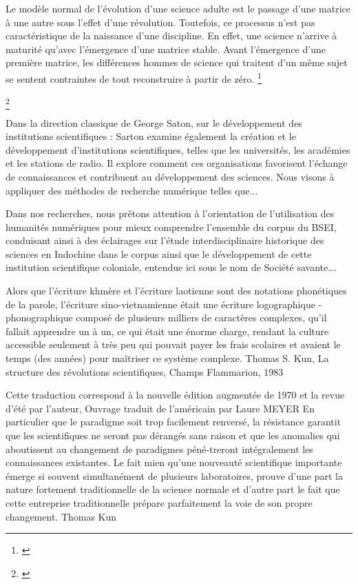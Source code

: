 Le modèle normal de l’évolution d’une science adulte est le passage d’une matrice à une autre sous l’effet d’une révolution. Toutefois, ce processus n’est pas caractéristique de la naissance d’une discipline. En effet, une science n'arrive à maturité qu'avec l'émergence d'une matrice stable. Avant l'émergence d'une première matrice, les différences hommes de science qui traitent d'un même sujet se sentent contraintes de tout reconstruire à partir de zéro. 
\footnote{\cite{malherbe1}}

\footnote{\cite{vinhky}}

Dans la direction classique de George Saton, sur le développement des institutions scientifiques : Sarton examine également la création et le développement d'institutions scientifiques, telles que les universités, les académies et les stations de radio. Il explore comment ces organisations favorisent l'échange de connaissances et contribuent au développement des sciences. Nous visons à appliquer des méthodes de recherche numérique telles que... 

Dans nos recherches, nous prêtons attention à l'orientation de l'utilisation des humanités numériques pour mieux comprendre l'ensemble du corpus du BSEI, conduisant ainsi à des éclairages sur l'étude interdisciplinaire historique des sciences en Indochine dans le corpus ainsi que le développement de cette institution scientifique coloniale, entendue ici sous le nom de Société savante….

Alors que l'écriture khmère et l'écriture laotienne sont des notations phonétiques de la parole, l'écriture sino-vietnamienne était une écriture logographique -phonographique composé de plusieurs milliers de caractères complexes, qu'il fallait apprendre un à un, ce qui était une énorme charge, rendant la culture accessible seulement à très peu qui pouvait payer les frais scolaires et avaient le temps (des années) pour maîtriser ce système complexe.
Thomas S. Kun, La structure des révolutions scientifiques, Champs Flammarion, 1983

Cette traduction correspond à la nouvelle édition augmentée de 1970 et la revue d'été par l'auteur,
Ouvrage traduit de l’américain par Laure MEYER
En particulier que le paradigme soit trop facilement renversé, la résistance garantit que les scientifiques ne seront pas dérangés sans raison et que les anomalies qui aboutissent au changement de paradigmes péné-treront intégralement les connaissances existantes. Le fait mien qu'une nouveauté scientifique importante émerge si souvent simultanément de plusieurs laboratoires, prouve d'une part la nature fortement traditionnelle de la science normale et d'autre part le fait que cette entreprise traditionnelle prépare parfaitement la voie de son propre changement. Thomas Kun



